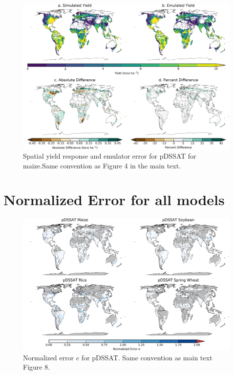 \documentclass[10pt]{article}
\begin{document}
{{\begin{figure}[h!]
  \includegraphics[width=\textwidth]{pdssat_maize.png}
  \caption{Spatial yield response and emulator error for pDSSAT for maize.Same convention as Figure 4 in the main text.}
  \label{fig:lpjmlrice}
\end{figure}


\clearpage
\section{Normalized Error for all models}

\begin{figure}[h!]
  \centering
  \includegraphics[width=15.5cm]{pDSSAT_spatial_error.png}
  \caption{Normalized error $e$ for pDSSAT. Same convention as main text Figure 8.}
\end{figure}

}}
\end{document}
